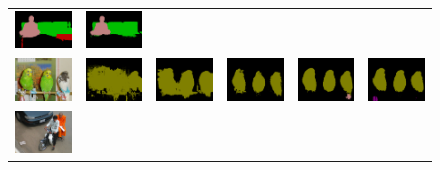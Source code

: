 \begin{figure}[p]
{\begin{tabular}{c c c c c c}
    \includegraphics[height=0.11\linewidth]{fig/val_crf_vis/strongweak/2009_001299.png} &
    \includegraphics[height=0.11\linewidth]{fig/val_crf_vis/cocomix/2009_001299.png} \\
    \includegraphics[height=0.123\linewidth]{fig/val_crf_vis/img/2010_004994.jpg} &
    \includegraphics[height=0.123\linewidth]{fig/val_crf_vis/adaweak/2010_004994.png} &
    \includegraphics[height=0.123\linewidth]{fig/val_crf_vis/bbox/2010_004994.png} &
    \includegraphics[height=0.123\linewidth]{fig/val_crf_vis/bbox_crf/2010_004994.png} &
    \includegraphics[height=0.123\linewidth]{fig/val_crf_vis/strongweak/2010_004994.png} &
    \includegraphics[height=0.123\linewidth]{fig/val_crf_vis/cocomix/2010_004994.png} \\
    \includegraphics[height=0.122\linewidth]{fig/val_crf_vis/img/2011_002322.jpg} &

\end{tabular}}
\end{figure}
